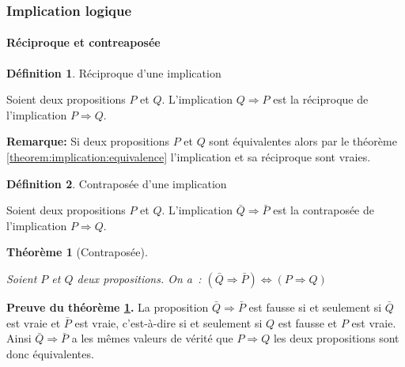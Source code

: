 \documentclass[10pt,notheorems]{beamer}
\theoremstyle{plain}
\newtheorem{theorem}{Théorème}
\theoremstyle{definition} %
\newtheorem{definition}{Définition}
\begin{document}
\begin{frame}
  \frametitle{Implication logique}
  \framesubtitle{Réciproque et contreaposée}
  \hypertarget{slide_reciproque_et_contraposee}{}

  \begin{definition}{Réciproque d'une implication}\label{def:implication:equivalence}

    Soient deux propositions $P$ et $Q$. L'implication $Q\Rightarrow P$ est la réciproque de l'implication $P\Rightarrow Q$.
  \end{definition}

  \bigskip

  \textbf{Remarque:} Si deux propositions $P$ et $Q$ sont équivalentes alors par le théorème \hyperlink{slide_implication_et_equivalence_1}{\ref{theorem:implication:equivalence}} l'implication et sa réciproque sont vraies.

  \bigskip

  \begin{definition}{Contraposée d'une implication}\label{def:implication:contraposee}

    Soient deux propositions $P$ et $Q$. L'implication $\bar Q\Rightarrow \bar P$ est la contraposée de l'implication $P\Rightarrow Q$.
  \end{definition}

  \bigskip

  \begin{theorem}[Contraposée]\label{theorem:implication:contraposee}

    Soient $P$ et $Q$ deux propositions. On a~: $(\bar Q \Rightarrow \bar P) \Leftrightarrow (P\Rightarrow Q)$
  \end{theorem}
\end{frame}

\begin{notes}

  \textbf{Preuve du théorème \hyperlink{slide_reciproque_et_contraposee}{\ref{theorem:implication:contraposee}}.} La proposition
  $\bar Q \Rightarrow \bar P$ est fausse si et seulement si $\bar Q$
  est vraie et $\bar P$ est vraie, c'est-à-dire si et seulement si $Q$
  est fausse et $P$ est vraie. Ainsi $\bar Q \Rightarrow \bar P$ a les
  mêmes valeurs de vérité que $P\Rightarrow Q$ les deux propositions
  sont donc équivalentes.

\end{notes}
\end{document}
